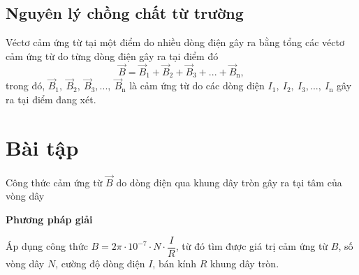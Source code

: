 \subsection{Nguyên lý chồng chất từ trường}
Véctơ cảm ứng từ tại một điểm do nhiều dòng điện gây ra bằng tổng các véctơ cảm ứng từ do từng dòng điện gây ra tại điểm đó
\begin{equation}
\vec{B}=\vec{B}_1+\vec{B}_2+\vec{B}_3+...+\vec{B}_\text{n},
\end{equation} 
trong đó, $\vec{B}_1, \ \vec{B}_2, \ \vec{B}_3,..., \ \vec{B}_\text{n}$ là cảm ứng từ do các dòng điện $I_1, \ I_2, \ I_3,..., \ I_\text{n}$ gây ra tại điểm đang xét.

\section{Bài tập}
\begin{dang}{Công thức cảm ứng từ $\vec{B}$ do dòng điện qua khung dây tròn gây ra tại tâm của vòng dây}
\end{dang}

\textbf{Phương pháp giải}

Áp dụng công thức  $B=2\pi \cdot 10^{-7}\cdot N \cdot \dfrac{I}{R}$, từ đó tìm được giá trị cảm ứng từ $B$, số vòng dây $N$, cường độ dòng điện $I$,  bán kính $R$ khung dây tròn.

\vspace{1em}
{
}

